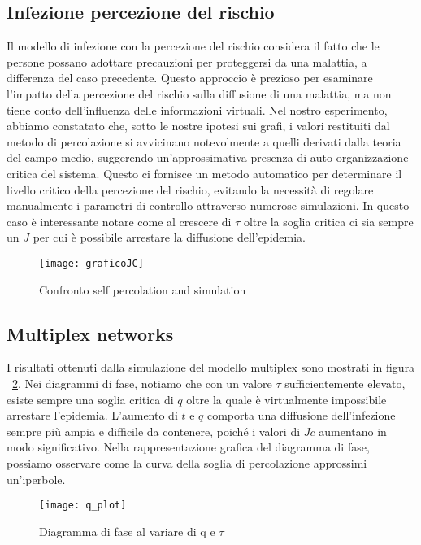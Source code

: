 \subsection{Infezione percezione del rischio}\label{subsec:res-infezione-con-la-percezione-del-rischio}
    Il modello di infezione con la percezione del rischio considera il fatto che le persone possano adottare precauzioni
    per proteggersi da una malattia, a differenza del caso precedente.
    Questo approccio è prezioso per esaminare l'impatto della percezione del rischio sulla diffusione di una malattia,
    ma non tiene conto dell'influenza delle informazioni virtuali.
    Nel nostro esperimento, abbiamo constatato che, sotto le nostre ipotesi sui grafi, i valori restituiti dal metodo di
    percolazione si avvicinano notevolmente a quelli derivati dalla teoria del campo medio, suggerendo un'approssimativa
    presenza di auto organizzazione critica del sistema.
    Questo ci fornisce un metodo automatico per determinare il livello critico della percezione del rischio, evitando la
    necessità di regolare manualmente i parametri di controllo attraverso numerose simulazioni.
    In questo caso è interessante notare come al crescere di $\tau$ oltre la soglia critica ci sia sempre un $J$ per cui è
    possibile arrestare la diffusione dell'epidemia.

    \begin{figure}[H]
        \texttt{[image: graficoJC]}\caption{Confronto self percolation and simulation}
        \label{fig:graficoJC}
    \end{figure}

\subsection{Multiplex networks}\label{subsec:res-multiplex-networks}
    I risultati ottenuti dalla simulazione del modello multiplex sono mostrati in figura ~\ref{fig:diagram_phase}.
    Nei diagrammi di fase, notiamo che con un valore $\tau$ sufficientemente elevato, esiste sempre una soglia critica
    di $q$ oltre la quale è virtualmente impossibile arrestare l'epidemia.
    L'aumento di $t$ e $q$ comporta una diffusione dell'infezione sempre più ampia e difficile da contenere,
    poiché i valori di $Jc$ aumentano in modo significativo.
    Nella rappresentazione grafica del diagramma di fase,
    possiamo osservare come la curva della soglia di percolazione approssimi un'iperbole.

    \begin{figure}[H]
        \texttt{[image: q\_plot]}\caption{Diagramma di fase al variare di q e $\tau$}
        \label{fig:diagram_phase}
    \end{figure}
